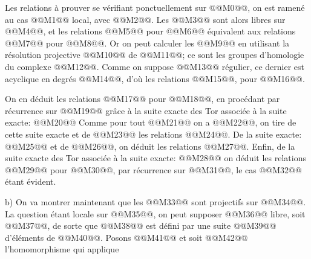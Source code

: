 
Les relations à prouver se vérifiant ponctuellement sur @@M0@@, on est ramené au cas @@M1@@ local, avec @@M2@@. Les @@M3@@ sont alors libres sur @@M4@@, et les relations @@M5@@ pour @@M6@@ équivalent aux relations @@M7@@ pour @@M8@@. Or on peut calculer les @@M9@@ en utilisant la résolution projective @@M10@@ de @@M11@@; ce sont les groupes d'homologie du complexe @@M12@@. Comme on suppose @@M13@@ régulier, ce dernier est acyclique en degrés @@M14@@, d'où les relations @@M15@@, pour @@M16@@.

On en déduit les relations @@M17@@ pour @@M18@@, en procédant par récurrence sur @@M19@@ grâce à la suite exacte des Tor associée à la suite exacte:
@@M20@@
Comme pour tout @@M21@@ on a @@M22@@, on tire de cette suite exacte et de @@M23@@ les relations @@M24@@. De la suite exacte:
@@M25@@
et de @@M26@@, on déduit les relations @@M27@@. Enfin, de la suite exacte des Tor associée à la suite exacte:
@@M28@@
on déduit les relations @@M29@@ pour @@M30@@, par récurrence sur @@M31@@, le cas @@M32@@ étant évident.

b) On va montrer maintenant que les @@M33@@ sont projectifs sur @@M34@@. La question étant locale sur @@M35@@, on peut supposer @@M36@@ libre, soit @@M37@@, de sorte que @@M38@@ est défini par une suite @@M39@@ d'éléments de @@M40@@. Posons @@M41@@ et soit @@M42@@ l'homomorphisme qui applique
